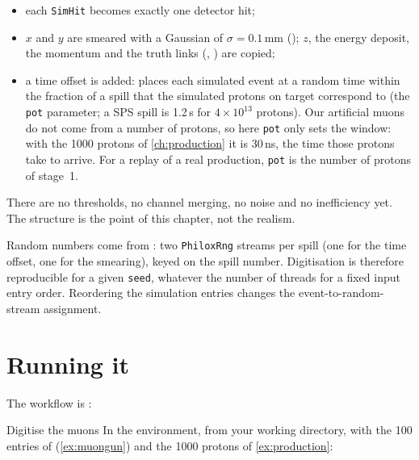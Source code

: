 \begin{itemize}
  \item each \texttt{SimHit} becomes exactly one detector hit;
  \item $x$ and $y$ are smeared with a Gaussian of $\sigma = 0.1$\,mm
        (); $z$, the energy deposit, the momentum
        and the truth links (, ) are copied;
  \item a time offset is added:  places each simulated event at a
        random time within the fraction of a spill that the simulated protons
        on target correspond to (the \texttt{pot} parameter; a SPS spill is
        1.2\,s for $4\times10^{13}$ protons). Our artificial muons do not
        come from a number of protons, so here \texttt{pot} only sets the
        window: with the 1000 protons of \cref{ch:production} it is 30\,ns,
        the time those protons take to arrive. For a replay of a real
        production, \texttt{pot} is the number of protons of stage~1.
\end{itemize}

There are no thresholds, no channel merging, no noise and no inefficiency yet.
The structure is the point of this chapter, not the realism.

\begin{note}
Random numbers come from : two \texttt{PhiloxRng} streams per
spill (one for the time offset, one for the smearing), keyed on the spill
number. Digitisation is therefore reproducible for a given \texttt{seed},
whatever the number of threads for a fixed input entry order. Reordering
the simulation entries changes the event-to-random-stream assignment.
\end{note}

\section{Running it}

The workflow is :


\begin{exercise}{Digitise the muons}
In the  environment, from your working directory, with the 100
entries of  (\cref{ex:muongun}) and the 1000 protons of
\cref{ex:production}:
\end{exercise}

